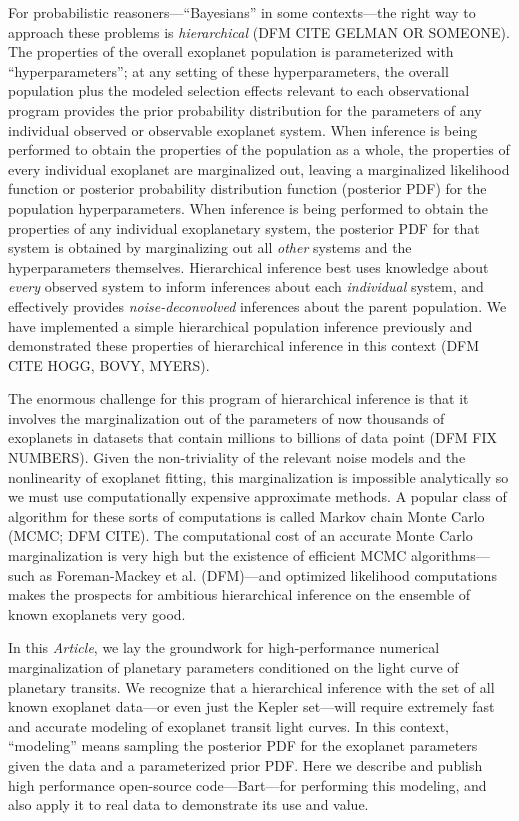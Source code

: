 \documentclass[12pt,preprint]{aastex}
\newcommand{\project}[1]{{\sffamily #1}}
\newcommand{\bart}{\project{Bart}}
\newcommand{\paper}{\emph{Article}}
\begin{document}
For probabilistic reasoners---``Bayesians'' in some contexts---the
right way to approach these problems is \emph{hierarchical} (DFM CITE
GELMAN OR SOMEONE).
The properties of the overall exoplanet population is parameterized with
``hyperparameters''; at any setting of these hyperparameters, the overall
population plus the modeled selection effects relevant to each observational
program provides the prior probability distribution for the parameters of any
individual observed or observable exoplanet system.
When inference is being performed to obtain the properties of the population
as a whole, the properties of every individual exoplanet are marginalized out,
leaving a marginalized likelihood function or posterior probability
distribution function (posterior PDF) for the population
hyperparameters.
When inference is being performed to obtain the
properties of any individual exoplanetary system, the posterior PDF
for that system is obtained by marginalizing out all \emph{other}
systems and the hyperparameters themselves.
Hierarchical inference
best uses knowledge about \emph{every} observed system to inform
inferences about each \emph{individual} system, and effectively
provides \emph{noise-deconvolved} inferences about the parent
population.
We have implemented a simple hierarchical population
inference previously and demonstrated these properties of hierarchical
inference in this context (DFM CITE HOGG, BOVY, MYERS).

The enormous challenge for this program of hierarchical inference is
that it involves the marginalization out of the parameters of now
thousands of exoplanets in datasets that contain millions to billions
of data point (DFM FIX NUMBERS).
Given the non-triviality of the
relevant noise models and the nonlinearity of exoplanet fitting, this
marginalization is impossible analytically so we must use computationally
expensive approximate methods.
A popular class of algorithm for these sorts
of computations is called Markov chain Monte Carlo (MCMC; DFM CITE).
The computational cost of an accurate Monte Carlo marginalization is very
high but the existence of efficient MCMC algorithms---such as Foreman-Mackey
et al. (DFM)---and optimized likelihood computations makes the prospects for
ambitious hierarchical inference on the ensemble of known exoplanets very
good.

In this \paper, we lay the groundwork for high-performance numerical
marginalization of planetary parameters conditioned on the light curve of
planetary transits.
We recognize that a hierarchical inference
with the set of all known exoplanet data---or even just the
\project{Kepler} set---will require extremely fast and accurate modeling of
exoplanet transit light curves.
In this context, ``modeling'' means sampling the posterior PDF for the
exoplanet parameters given the data and a parameterized prior PDF.
Here we describe and publish high performance open-source code---\bart---for
performing this modeling, and also apply it to real data to demonstrate its
use and value.
\end{document}
